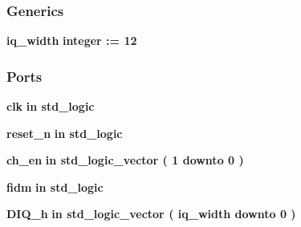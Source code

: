 \subsubsection*{Generics}
 \begin{DoxyCompactItemize}
\item 
{\bf iq\+\_\+width} {\bfseries {\bfseries \textcolor{comment}{integer}\textcolor{vhdlchar}{ }\textcolor{vhdlchar}{ }\textcolor{vhdlchar}{\+:}\textcolor{vhdlchar}{=}\textcolor{vhdlchar}{ }\textcolor{vhdlchar}{ } \textcolor{vhdldigit}{12} \textcolor{vhdlchar}{ }}}
\end{DoxyCompactItemize}
\subsubsection*{Ports}
 \begin{DoxyCompactItemize}
\item 
{\bf clk}  {\bfseries {\bfseries \textcolor{keywordflow}{in}\textcolor{vhdlchar}{ }}} {\bfseries \textcolor{comment}{std\+\_\+logic}\textcolor{vhdlchar}{ }} 
\item 
{\bf reset\+\_\+n}  {\bfseries {\bfseries \textcolor{keywordflow}{in}\textcolor{vhdlchar}{ }}} {\bfseries \textcolor{comment}{std\+\_\+logic}\textcolor{vhdlchar}{ }} 
\item 
{\bf ch\+\_\+en}  {\bfseries {\bfseries \textcolor{keywordflow}{in}\textcolor{vhdlchar}{ }}} {\bfseries \textcolor{comment}{std\+\_\+logic\+\_\+vector}\textcolor{vhdlchar}{ }\textcolor{vhdlchar}{(}\textcolor{vhdlchar}{ }\textcolor{vhdlchar}{ } \textcolor{vhdldigit}{1} \textcolor{vhdlchar}{ }\textcolor{keywordflow}{downto}\textcolor{vhdlchar}{ }\textcolor{vhdlchar}{ } \textcolor{vhdldigit}{0} \textcolor{vhdlchar}{ }\textcolor{vhdlchar}{)}\textcolor{vhdlchar}{ }} 
\item 
{\bf fidm}  {\bfseries {\bfseries \textcolor{keywordflow}{in}\textcolor{vhdlchar}{ }}} {\bfseries \textcolor{comment}{std\+\_\+logic}\textcolor{vhdlchar}{ }} 
\item 
{\bf D\+I\+Q\+\_\+h}  {\bfseries {\bfseries \textcolor{keywordflow}{in}\textcolor{vhdlchar}{ }}} {\bfseries \textcolor{comment}{std\+\_\+logic\+\_\+vector}\textcolor{vhdlchar}{ }\textcolor{vhdlchar}{(}\textcolor{vhdlchar}{ }\textcolor{vhdlchar}{ }\textcolor{vhdlchar}{ }\textcolor{vhdlchar}{ }{\bfseries {\bf iq\+\_\+width}} \textcolor{vhdlchar}{ }\textcolor{keywordflow}{downto}\textcolor{vhdlchar}{ }\textcolor{vhdlchar}{ } \textcolor{vhdldigit}{0} \textcolor{vhdlchar}{ }\textcolor{vhdlchar}{)}\textcolor{vhdlchar}{ }} 
\item 

\end{DoxyCompactItemize}
